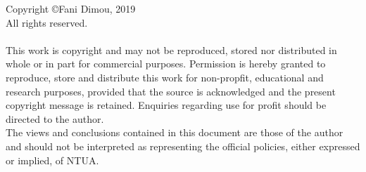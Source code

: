 \thispagestyle{empty}
\vspace*{\fill}
\hfill\break
Copyright \copyright Fani Dimou, 2019\\
All rights reserved.\\[12pt]\\
\hfill\break
This work is copyright and may not be reproduced, stored nor distributed in whole or in part for commercial purposes. Permission is hereby granted to reproduce, store and distribute this work for non-propfit, educational and research purposes, provided that the source is acknowledged and the present copyright message is retained. Enquiries regarding use for profit should be directed to the author. \\
\hfill\break
The views and conclusions contained in this document are those of the author and should not be interpreted as representing the official policies, either expressed or implied, of NTUA.
\vspace*{2cm}
